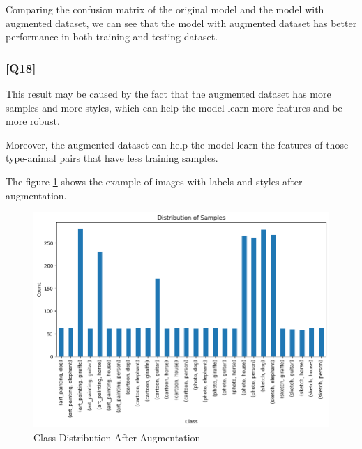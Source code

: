 \documentclass{article}
\begin{document}
Comparing the confusion matrix of the original model and the model with augmented dataset, 
we can see that the model with augmented dataset has better performance in both training and testing dataset.


\subsubsection*{[Q18]}
This result may be caused by the fact that the augmented dataset has more samples and more styles,
which can help the model learn more features and be more robust.

Moreover, the augmented dataset can help the model learn the features of those type-animal pairs that have less training samples.

The figure \ref{fig:class_distribution_aug} shows the example of images with labels and styles after augmentation.


\begin{figure}[!ht]
    \centering
    \includegraphics[width=\textwidth]{./pic/class_distribution_3041.png}
    \caption{Class Distribution After Augmentation}
    \label{fig:class_distribution_aug}
\end{figure}
\end{document}
